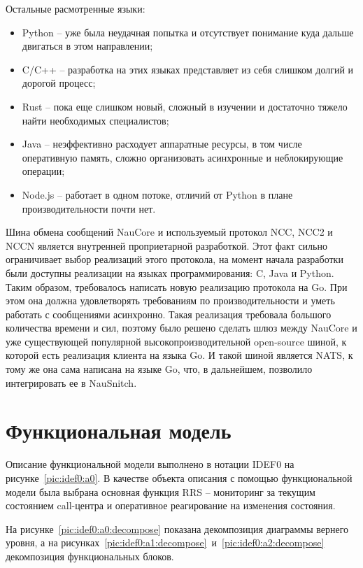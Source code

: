 Остальные расмотренные языки:
\begin{itemize}
    \item Python -- уже была неудачная попытка и отсутствует понимание куда дальше двигаться в этом направлении;
    \item C/C++ -- разработка на этих языках представляет из себя слишком долгий и дорогой процесс; %
    \item Rust -- пока еще слишком новый, сложный в изучении и достаточно тяжело найти необходимых специалистов;
    \item Java -- неэффективно расходует аппаратные ресурсы, в том числе оперативную память,
    сложно организовать асинхронные и неблокирующие операции;
    \item Node.js -- работает в одном потоке, отличий от Python в плане производительности почти нет.
\end{itemize}

Шина обмена сообщений NauCore и используемый протокол NCC, NCC2 и NCCN является
внутренней проприетарной разработкой.
Этот факт сильно ограничивает выбор реализаций этого протокола,
на момент начала разработки были доступны реализации на языках программирования: C, Java и Python.
Таким образом, требовалось написать новую реализацию протокола на Go.
При этом она должна удовлетворять требованиям по производительности
и уметь работать с сообщениями асинхронно.
Такая реализация требовала большого количества времени и сил,
поэтому было решено сделать шлюз между NauCore и
уже существующей популярной высокопроизводительной open-source шиной,
к которой есть реализация клиента на языка Go.
И такой шиной является NATS, к тому же она сама написана на языке Go,
что, в дальнейшем, позволило интегрировать ее в NauSnitch.

\section{Функциональная модель}

Описание функциональной модели выполнено в нотации IDEF0 на рисунке~\ref{pic:idef0:a0}.
В качестве объекта описания с помощью функциональной модели была выбрана основная функция RRS --
мониторинг за текущим состоянием call-центра и оперативное реагирование на изменения состояния.

На рисунке~\ref{pic:idef0:a0:decompose} показана декомпозиция диаграммы вернего уровня,
а на рисунках~\ref{pic:idef0:a1:decompose}~и~\ref{pic:idef0:a2:decompose} декомпозиция функциональных блоков.

